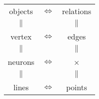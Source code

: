 \documentclass[a4paper,10pt]{article}
\title{}
\author{}
\begin{document}
\maketitle

\begin{center}
\begin{tabular}{|ccc|}
\hline
objects & $\Leftrightarrow$ & relations\\
$\|$ & & $\|$ \\
vertex & $\Leftrightarrow$ & edges\\
$\|$ & & $\|$ \\
neurons & $\Leftrightarrow$ & ×\\
$\|$ & & $\|$ \\
lines & $\Leftrightarrow$ & points\\
\hline
\end{tabular}
\end{center}

\begin{abstract}

\end{abstract}

\section{}
\end{document}

